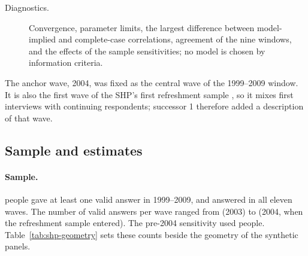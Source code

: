 \begin{description}
\item[Diagnostics.] Convergence, parameter limits, the largest difference between model-implied and complete-case correlations, agreement of the nine windows, and the effects of the sample sensitivities; no model is chosen by information criteria.
\end{description}
The anchor wave, 2004, was fixed as the central wave of the 1999--2009 window. It is also the first wave of the SHP's first refreshment sample \cite{voorpostel2025shp}, so it mixes first interviews with continuing respondents; successor 1 therefore added a description of that wave.

\subsection{Sample and estimates}\label{sec:shp-results}

\paragraph{Sample.}
 people gave at least one valid answer in 1999--2009, and  answered in all eleven waves. The number of valid answers per wave ranged from  (2003) to  (2004, when the refreshment sample entered). The pre-2004 sensitivity used  people. Table~\ref{tab:shp-geometry} sets these counts beside the geometry of the synthetic panels.

